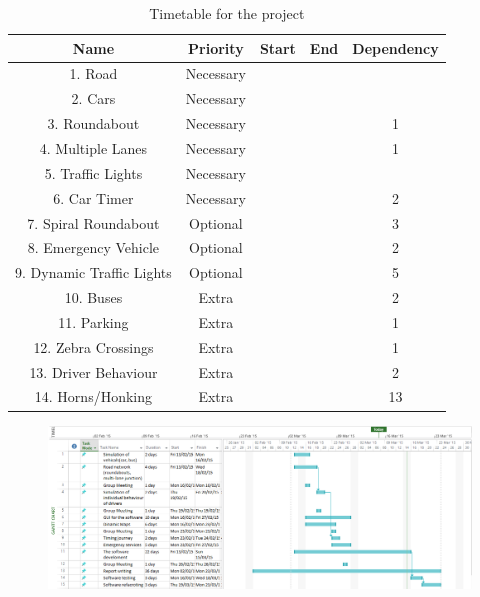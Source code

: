 \documentclass{article}
\begin{document}
	\begin{table}[H]
		\centering
		\label{TimetableForTheProject}
		\begin{tabular}{|c|c|c|c|c|}
			\hline {\bf Name} & {\bf Priority} & {\bf Start} & {\bf End} & {\bf Dependency} \\ 
			\hline 1. Road & Necessary &  &  &  \\ 
			\hline 2. Cars& Necessary &  &  &  \\ 
			\hline 3. Roundabout & Necessary &  &  & 1 \\ 
			\hline 4. Multiple Lanes & Necessary &  &  & 1 \\ 
			\hline 5. Traffic Lights & Necessary &  &  &  \\ 
			\hline 6.  Car Timer & Necessary &  &  & 2 \\ 
			\hline 7. Spiral Roundabout & Optional &  &  & 3 \\ 
			\hline 8. Emergency Vehicle & Optional &  &  & 2 \\ 
			\hline 9. Dynamic Traffic Lights & Optional &  &  & 5 \\ 
			\hline 10. Buses& Extra &  &  & 2 \\ 
			\hline  11. Parking & Extra &  &  & 1 \\ 
			\hline  12. Zebra Crossings & Extra &  &  & 1 \\ 
			\hline 13. Driver Behaviour & Extra &  &  & 2 \\ 
			\hline 14. Horns/Honking & Extra &  &  & 13 \\ 
			\hline 
		\end{tabular} 
		\caption{Timetable for the project}
	\end{table}
	
	\begin{figure}
		\centering
		\includegraphics[width=\textwidth]{"G Chart"}
	\end{figure}
	
	
\end{document}
